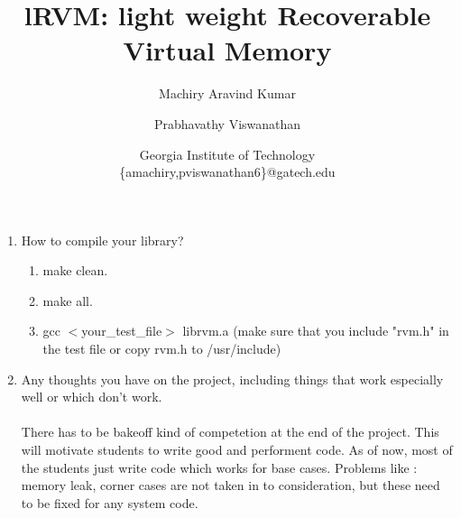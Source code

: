\documentclass[[10pt]{article}
\title{lRVM: light weight Recoverable Virtual Memory}
\author{
    Machiry Aravind Kumar\\
   \and
    Prabhavathy Viswanathan
}
\date{Georgia Institute of Technology\\
\{amachiry,pviswanathan6\}@gatech.edu}
\begin{document}
\maketitle
\begin{enumerate}
\item How to compile your library?
\begin{enumerate}
\item make clean.
\item make all.
\item gcc $<$your\_test\_file$>$ librvm.a (make sure that you include "rvm.h" in the test file or copy rvm.h to /usr/include)
\end{enumerate}
\item Any thoughts you have on the project, including things that work especially well or which don't work.\\\\
There has to be bakeoff kind of competetion at the end of the project. This will motivate students to write good and performent code. As of now, most of the students just write code which works for base cases. Problems like : memory leak, corner cases are not taken in to consideration, but these need to be fixed for any system code.


\end{enumerate}
\end{document}
